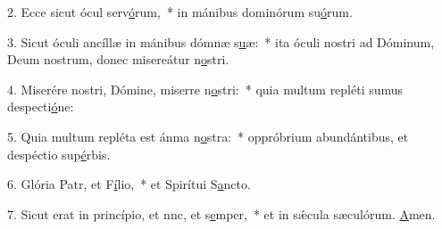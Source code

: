 2. Ecce sicut ócul serv\uline{ó}rum,~* in mánibus dominórum su\uline{ó}rum.\par 
3. Sicut óculi ancíllæ in mánibus dómnæ s\uline{u}æ:~* ita óculi nostri ad Dóminum, Deum nostrum, donec misereátur n\uline{o}stri.\par 
4. Miserére nostri, Dómine, miserre n\uline{o}stri:~* quia multum repléti sumus despecti\uline{ó}ne:\par 
5. Quia multum repléta est ánma n\uline{o}stra:~* oppróbrium abundántibus, et despéctio sup\uline{é}rbis.\par 
6. Glória Patr, et F\uline{í}lio,~* et Spirítui S\uline{a}ncto.\par 
7. Sicut erat in princípio, et nnc, et s\uline{e}mper,~* et in sǽcula sæculórum. \uline{A}men.\par 
